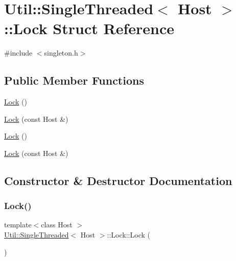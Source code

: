 \hypertarget{structUtil_1_1SingleThreaded_1_1Lock}{}\section{Util\+:\+:Single\+Threaded$<$ Host $>$\+:\+:Lock Struct Reference}
\label{structUtil_1_1SingleThreaded_1_1Lock}


{\ttfamily \#include $<$singleton.\+h$>$}

\subsection*{Public Member Functions}
\begin{DoxyCompactItemize}
\item 
\mbox{\hyperlink{structUtil_1_1SingleThreaded_1_1Lock_afd207df7a7a755030a139f082bdd3ac7}{Lock}} ()
\item 
\mbox{\hyperlink{structUtil_1_1SingleThreaded_1_1Lock_ad3f29b21cc23169f60d96950ad9cb99f}{Lock}} (const Host \&)
\item 
\mbox{\hyperlink{structUtil_1_1SingleThreaded_1_1Lock_afd207df7a7a755030a139f082bdd3ac7}{Lock}} ()
\item 
\mbox{\hyperlink{structUtil_1_1SingleThreaded_1_1Lock_ad3f29b21cc23169f60d96950ad9cb99f}{Lock}} (const Host \&)
\end{DoxyCompactItemize}


\subsection{Constructor \& Destructor Documentation}
\mbox{\label{structUtil_1_1SingleThreaded_1_1Lock_afd207df7a7a755030a139f082bdd3ac7}} 
\subsubsection{\texorpdfstring{Lock()}{Lock()}\hspace{0.1cm}{\footnotesize\ttfamily [1/4]}}
{\footnotesize\ttfamily template$<$class Host $>$ \\
\mbox{\hyperlink{classUtil_1_1SingleThreaded}{Util\+::\+Single\+Threaded}}$<$ Host $>$\+::Lock\+::\+Lock (\begin{DoxyParamCaption}{ }\end{DoxyParamCaption})\hspace{0.3cm}{\ttfamily [inline]}}


